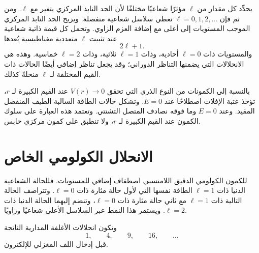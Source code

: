 يحدِّد كل مقدار من \(\ell\) مؤثرًا شعاعيًا مختلفًا لأن الحد النابذ المركزي يتغير مع \(\ell\). ومن ثم فإن \(\ell=0,1,2,\ldots\) تعطي سلاسل شعاعية منفصلة. ويزيح الحد النابذ المركزي الموجب المستويات إلى أعلى مع إضافة العزم الزاوي. وتحمل كل قيمة ذاتية شعاعية عند تثبيت \(\ell\) متعددية مغناطيسية بُعدها
\begin{equation}
2\ell+1.
\end{equation}
والمستويات ذات \(\ell=0\) أحادية، وذات \(\ell=1\) ثلاثية، وذات \(\ell=2\) خماسية. وهذه هي الانحلالات التي يضمنها التناظر الدوراني؛ وقد يجعل تناظر إضافي أيضًا الحالات ذات القيم المختلفة لـ \(\ell\) منحلةً كذلك.

بالنسبة إلى الكمونات من النوع الذري التي تحقق \(V(r)\to0\) عند القيم الكبيرة لـ \(r\)، تؤخذ عتبة الإفلات اصطلاحًا عند \(E=0\). وتشكل حالات الطاقة السالبة الطيف المنفصل المقيد. وعند \(E=0\) وما فوقه نصادف المتصل التشتتي. وتعتمد هذه العبارة على سلوك الكمون عند القيم الكبيرة لـ \(r\)، ولا تنطبق على كمون مركزي حابس.

\section{الانحلال الكولومي الخاص}

للکمون الكولومي الدقيق اللامنسبي اصطفاف إضافي للمستويات. فللحالة الشعاعية الدنيا ذات \(\ell=1\) الطاقة نفسها التي لأول حالة مثارة ذات \(\ell=0\). وتتراصف الحالة التالية ذات \(\ell=1\) مع ثاني حالة مثارة ذات \(\ell=0\)، وتنضم إليهما الحالة الدنيا ذات \(\ell=2\). ويستمر هذا النمط عبر السلاسل الأعلى شعاعيًا وزاويًا.

\begin{classroomqa}
\end{classroomqa}

وتكون انحلالات الأغلفة المدارية الناتجة
\begin{equation}
1,\qquad 4,\qquad 9,\qquad 16,\qquad \ldots
\end{equation}
قبل إدخال اللف المغزلي للإلكترون.

\begin{classroomqa}
\end{classroomqa}

